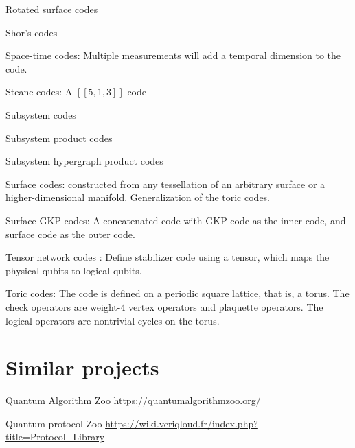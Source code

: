 \documentclass[aps,%
pra, twocolumn,%
notitlepage,longbibliography]{revtex4-2}
\begin{document}
Rotated surface codes

Shor's codes

Space-time codes: Multiple measurements will add a temporal dimension
to the code.

Steane codes: A $[[5,1,3]]$ code

Subsystem codes

Subsystem product codes

Subsystem hypergraph product codes

Surface codes: constructed from any tessellation of an arbitrary
surface or a higher-dimensional manifold. Generalization of the toric codes.

Surface-GKP codes: A concatenated code with GKP code as the inner
code, and surface code as the outer code.

Tensor network codes \cite{farrelly2020tensor}: Define stabilizer code
using a tensor, which maps the physical qubits to logical qubits.



Toric codes: The code is defined on a periodic square lattice, that
is, a torus. The check operators are weight-4 vertex operators and
plaquette operators. The logical operators are nontrivial cycles on
the torus.








\section{Similar projects}
Quantum Algorithm Zoo 
\url{https://quantumalgorithmzoo.org/}

Quantum protocol Zoo
\url{https://wiki.veriqloud.fr/index.php?title=Protocol_Library}


%
\end{document}
